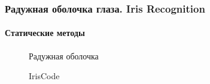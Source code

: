\begin{frame}[allowframebreaks]
\frametitle{Радужная оболочка глаза. Iris Recognition}
\framesubtitle{Статические методы}

\begin{figure}
    \begin{center}
    \end{center}
    \caption{Радужная оболочка}\label{pict:iris}
\end{figure} 

\begin{figure}
    \begin{center}
    \end{center}
    \caption{IrisCode\textregistered}\label{pict:iriscode}
\end{figure} 


\end{frame}
